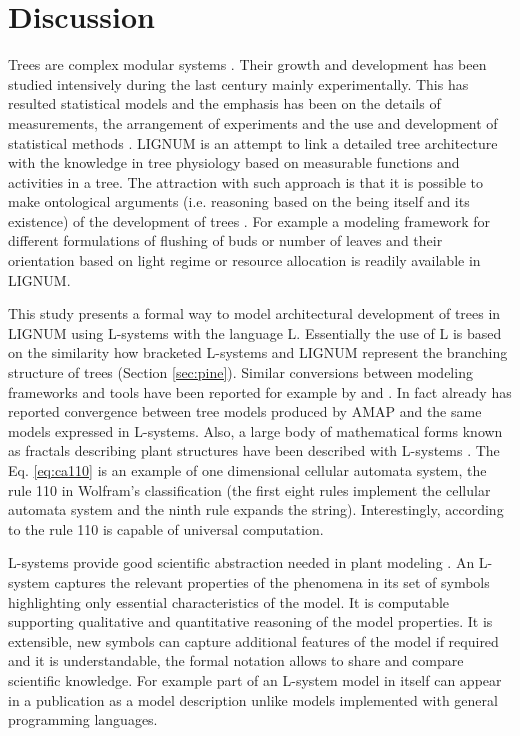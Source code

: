 \section{Discussion}

Trees are complex modular systems \citep{thomas:00}.  Their growth and
development  has  been studied  intensively  during  the last  century
mainly experimentally.   This has resulted statistical  models and the
emphasis has been  on the details of measurements,  the arrangement of
experiments  and  the  use  and  development  of  statistical  methods
\citep{hari:99}.   LIGNUM  is  an  attempt  to link  a  detailed  tree
architecture with the knowledge in tree physiology based on measurable
functions and activities in a  tree. The attraction with such approach
is that it  is possible to make ontological  arguments (i.e. reasoning
based on  the being  itself and its  existence) of the  development of
trees  \citep{perttunen:01}.   For example  a  modeling framework  for
different formulations  of flushing  of buds or  number of  leaves and
their  orientation based  on light  regime or  resource  allocation is
readily available in LIGNUM.

This study presents a formal way to model architectural development of
trees in LIGNUM using L-systems  with the language L.  Essentially the
use of L is based on the similarity how bracketed L-systems and LIGNUM
represent the  branching structure of  trees (Section \ref{sec:pine}).
Similar conversions  between modeling  frameworks and tools  have been
reported for example by \citet{ferraro:02} and \citet{dzierzon:03}. In
fact already \citet{kurth:em94}  has reported convergence between tree
models produced  by AMAP and  the same models expressed  in L-systems.
Also, a large body of  mathematical forms known as fractals describing
plant structures have  been described with L-systems \citep{kurth:99}.
The  Eq.  \ref{eq:ca110}  is an  example of  one  dimensional cellular
automata  system,   the  rule  110   in  Wolfram's  \citep{wolfram:02}
classification (the first eight  rules implement the cellular automata
system  and  the  ninth  rule  expands  the  string).   Interestingly,
according to  \citet{wolfram:02} the rule 110 is  capable of universal
computation.

L-systems provide good scientific abstraction needed in plant modeling
\citep[c.f.][]{regev:02}.    An   L-system   captures   the   relevant
properties of  the phenomena in  its set of symbols  highlighting only
essential characteristics  of the model.  It  is computable supporting
qualitative and quantitative reasoning of the model properties.  It is
extensible, new  symbols can capture additional features  of the model
if required  and it is  understandable, the formal notation  allows to
share  and  compare scientific  knowledge.   For  example  part of  an
L-system  model in  itself  can appear  in  a publication  as a  model
description  unlike   models  implemented  with   general  programming
languages.

